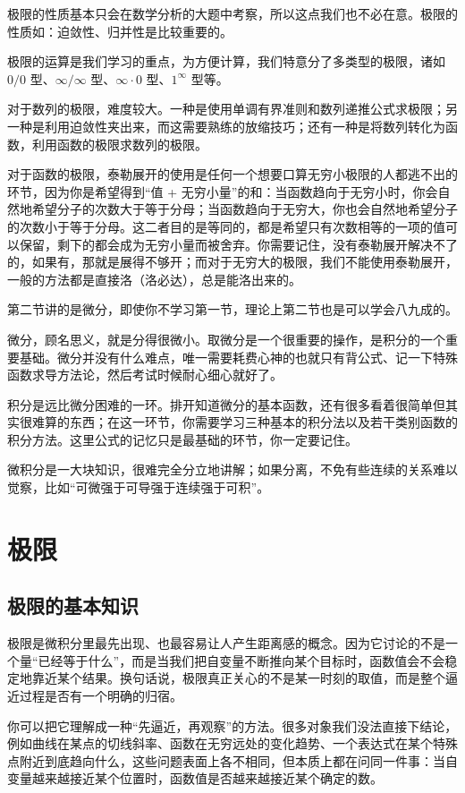 \documentclass[UTF8]{ctexbook}
\begin{document}
极限的性质基本只会在数学分析的大题中考察，所以这点我们也不必在意。极限的性质如：迫敛性、归并性是比较重要的。

极限的运算是我们学习的重点，为方便计算，我们特意分了多类型的极限，诸如 $0/0$ 型、$\infty/\infty$ 型、$\infty\cdot 0$ 型、$1^\infty$ 型等。

对于数列的极限，难度较大。一种是使用单调有界准则和数列递推公式求极限；另一种是利用迫敛性夹出来，而这需要熟练的放缩技巧；还有一种是将数列转化为函数，利用函数的极限求数列的极限。

对于函数的极限，泰勒展开的使用是任何一个想要口算无穷小极限的人都逃不出的环节，因为你是希望得到“值 + 无穷小量”的和：当函数趋向于无穷小时，你会自然地希望分子的次数大于等于分母；当函数趋向于无穷大，你也会自然地希望分子的次数小于等于分母。这二者目的是等同的，都是希望只有次数相等的一项的值可以保留，剩下的都会成为无穷小量而被舍弃。你需要记住，没有泰勒展开解决不了的，如果有，那就是展得不够开；而对于无穷大的极限，我们不能使用泰勒展开，一般的方法都是直接洛（洛必达），总是能洛出来的。

第二节讲的是微分，即使你不学习第一节，理论上第二节也是可以学会八九成的。

微分，顾名思义，就是分得很微小。取微分是一个很重要的操作，是积分的一个重要基础。微分并没有什么难点，唯一需要耗费心神的也就只有背公式、记一下特殊函数求导方法论，然后考试时候耐心细心就好了。

积分是远比微分困难的一环。排开知道微分的基本函数，还有很多看着很简单但其实很难算的东西；在这一环节，你需要学习三种基本的积分法以及若干类别函数的积分方法。这里公式的记忆只是最基础的环节，你一定要记住。

微积分是一大块知识，很难完全分立地讲解；如果分离，不免有些连续的关系难以觉察，比如“可微强于可导强于连续强于可积”。



\newpage

\section{极限}
\subsection{极限的基本知识}
极限是微积分里最先出现、也最容易让人产生距离感的概念。因为它讨论的不是一个量“已经等于什么”，而是当我们把自变量不断推向某个目标时，函数值会不会稳定地靠近某个结果。换句话说，极限真正关心的不是某一时刻的取值，而是整个逼近过程是否有一个明确的归宿。

你可以把它理解成一种“先逼近，再观察”的方法。很多对象我们没法直接下结论，例如曲线在某点的切线斜率、函数在无穷远处的变化趋势、一个表达式在某个特殊点附近到底趋向什么，这些问题表面上各不相同，但本质上都在问同一件事：当自变量越来越接近某个位置时，函数值是否越来越接近某个确定的数。
\end{document}
